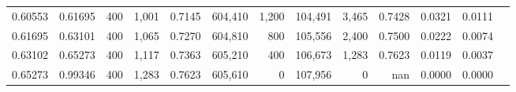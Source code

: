 \begin{tabular}{rrrrrrrrrrrrr}
0.60553 & 0.61695 &    400 & 1,001 &                                     0.7145 & 604,410 &   1,200 & 104,491 &   3,465 & 0.7428 & 0.0321 & 0.0111 \\
0.61695 & 0.63101 &    400 & 1,065 &                                     0.7270 & 604,810 &     800 & 105,556 &   2,400 & 0.7500 & 0.0222 & 0.0074 \\
0.63102 & 0.65273 &    400 & 1,117 &                                     0.7363 & 605,210 &     400 & 106,673 &   1,283 & 0.7623 & 0.0119 & 0.0037 \\
0.65273 & 0.99346 &    400 & 1,283 &                                     0.7623 & 605,610 &       0 & 107,956 &       0 &    nan & 0.0000 & 0.0000 \\
\bottomrule
\end{tabular}
